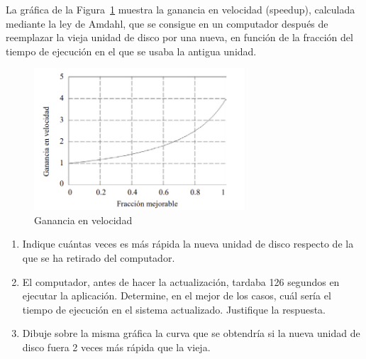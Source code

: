 \begin{ejercicio}
La gráfica de la Figura~\ref{fig:1_12} muestra la ganancia en velocidad (speedup), calculada mediante la ley de Amdahl, que se consigue en un computador después de reemplazar la vieja unidad de disco por una nueva, en función de la fracción del tiempo de ejecución en el que se usaba la antigua unidad.
\begin{figure}
    \centering
    \includegraphics[width=0.7\textwidth]{Figuras/Ej_1_12.png}
    \caption{Ganancia en velocidad}
    \label{fig:1_12}
\end{figure}
\begin{enumerate}
    \item Indique cuántas veces es más rápida la nueva unidad de disco respecto de la que se ha retirado del computador.
    \item El computador, antes de hacer la actualización, tardaba 126 segundos en ejecutar la aplicación. Determine, en el mejor de los casos, cuál sería el tiempo de ejecución en el sistema actualizado. Justifique la respuesta.
    \item Dibuje sobre la misma gráfica la curva que se obtendría si la nueva unidad de disco fuera 2 veces más rápida que la vieja.
\end{enumerate}
\end{ejercicio}


